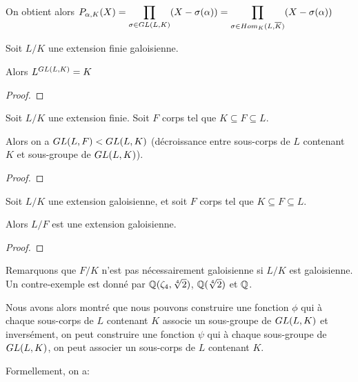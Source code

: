 On obtient alors $P_{\alpha, K}(X) = \displaystyle \prod_{\sigma \in
	GL(L, K)} (X - \sigma(\alpha)) = \displaystyle \prod_{\sigma \in
		Hom_{K}(L, \overline{K})} (X - \sigma(\alpha))$

\begin{theorem}
	Soit $L/K$ une extension finie galoisienne.

	Alors $L^{GL(L, K)} = K$
\end{theorem}

\ifdefined\outputproof
\begin{proof}

\end{proof}
\fi

\begin{proposition}
	Soit $L/K$ une extension finie.
	Soit $F$ corps tel que $K \subseteq F \subseteq L$.

	Alors on a $GL(L, F) < GL(L, K)$ (décroissance entre
	sous-corps de $L$ contenant $K$ et sous-groupe de $GL(L, K)$).
\end{proposition}

\ifdefined\outputproof
\begin{proof}

\end{proof}
\fi

\begin{proposition}
	Soit $L/K$ une extension galoisienne, et soit $F$ corps tel que $K \subseteq
	F \subseteq L$.

	Alors $L/F$ est une extension galoisienne.
\end{proposition}

\ifdefined\outputproof
\begin{proof}

\end{proof}
\fi

Remarquons que $F/K$ n'est pas nécessairement galoisienne si $L/K$ est
galoisienne. Un contre-exemple est donné par $\mathbb{Q}(\zeta_{4},
\sqrt[4]{2})$, $\mathbb{Q}(\sqrt[4]{2})$ et $\mathbb{Q}$.

Nous avons alors montré que nous pouvons construire une fonction $\phi$ qui à
chaque sous-corps de $L$ contenant $K$ associe un sous-groupe de
$GL(L, K)$ et inversément, on peut construire une fonction $\psi$ qui
à chaque sous-groupe de $GL(L, K)$, on peut associer un sous-corps de
$L$ contenant $K$.

Formellement, on a:

